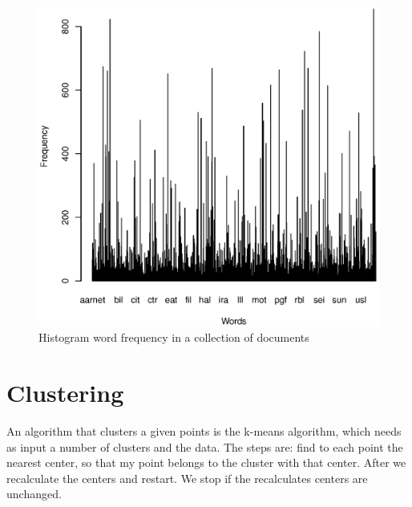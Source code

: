 \documentclass[a4paper,11pt]{article}
\begin{document}
\begin{figure}[h!]
  \begin{centering}
    \includegraphics[trim=0 0 0 50,scale=0.5]{../graphs/q1/Histogram}
    \par\end{centering}
  \caption{Histogram word frequency in a collection of documents}
  \label{fig:jacobi-conv}
\end{figure}



\section{Clustering}

%  

An algorithm  that clusters  a given points  is the k-means  algorithm, which
needs as input  a number of clusters and  the data. The steps are:  find to each
point the  nearest center,  so that my  point belongs  to the cluster  with that
center.  After  we  recalculate  the   centers  and  restart.  We  stop  if  the
recalculates centers are unchanged.
\end{document}
